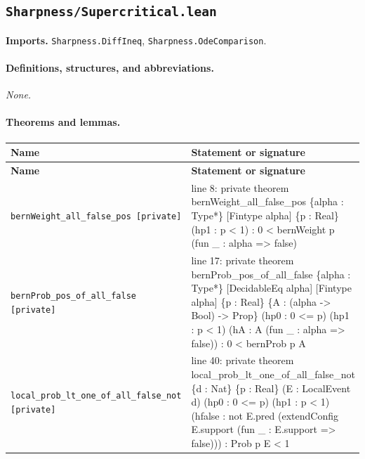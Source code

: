 \documentclass[10pt]{article}
\newcommand{\module}[1]{\texttt{#1}}
\begin{document}
\subsection*{\module{Sharpness/Supercritical.lean}}
\textbf{Imports.} \module{Sharpness.DiffIneq}, \module{Sharpness.OdeComparison}.
\paragraph{Definitions, structures, and abbreviations.}
\emph{None.}

\paragraph{Theorems and lemmas.}
\begin{longtable}{>{\raggedright\arraybackslash}p{} >{\raggedright\arraybackslash}p{}}
\textbf{Name} & \textbf{Statement or signature} \\
\hline
\endfirsthead
\textbf{Name} & \textbf{Statement or signature} \\
\hline
\endhead
\texttt{bernWeight\_\allowbreak{}all\_\allowbreak{}false\_\allowbreak{}pos [private]} & {\ttfamily\scriptsize line 8:\allowbreak{} private theorem bernWeight\_\allowbreak{}all\_\allowbreak{}false\_\allowbreak{}pos \{alpha :\allowbreak{} Type*\allowbreak{}\} [Fintype alpha] \{p :\allowbreak{} Real\} (\allowbreak{}hp1 :\allowbreak{} p < 1)\allowbreak{} :\allowbreak{} 0 < bernWeight p (\allowbreak{}fun \_\allowbreak{} :\allowbreak{} alpha =\allowbreak{}> false)\allowbreak{}} \\[0.45em]
\texttt{bernProb\_\allowbreak{}pos\_\allowbreak{}of\_\allowbreak{}all\_\allowbreak{}false [private]} & {\ttfamily\scriptsize line 17:\allowbreak{} private theorem bernProb\_\allowbreak{}pos\_\allowbreak{}of\_\allowbreak{}all\_\allowbreak{}false \{alpha :\allowbreak{} Type*\allowbreak{}\} [DecidableEq alpha] [Fintype alpha] \{p :\allowbreak{} Real\} \{A :\allowbreak{} (\allowbreak{}alpha -\allowbreak{}> Bool)\allowbreak{} -\allowbreak{}> Prop\} (\allowbreak{}hp0 :\allowbreak{} 0 <=\allowbreak{} p)\allowbreak{} (\allowbreak{}hp1 :\allowbreak{} p < 1)\allowbreak{} (\allowbreak{}hA :\allowbreak{} A (\allowbreak{}fun \_\allowbreak{} :\allowbreak{} alpha =\allowbreak{}> false)\allowbreak{})\allowbreak{} :\allowbreak{} 0 < bernProb p A} \\[0.45em]
\texttt{local\_\allowbreak{}prob\_\allowbreak{}lt\_\allowbreak{}one\_\allowbreak{}of\_\allowbreak{}all\_\allowbreak{}false\_\allowbreak{}not [private]} & {\ttfamily\scriptsize line 40:\allowbreak{} private theorem local\_\allowbreak{}prob\_\allowbreak{}lt\_\allowbreak{}one\_\allowbreak{}of\_\allowbreak{}all\_\allowbreak{}false\_\allowbreak{}not \{d :\allowbreak{} Nat\} \{p :\allowbreak{} Real\} (\allowbreak{}E :\allowbreak{} LocalEvent d)\allowbreak{} (\allowbreak{}hp0 :\allowbreak{} 0 <=\allowbreak{} p)\allowbreak{} (\allowbreak{}hp1 :\allowbreak{} p < 1)\allowbreak{} (\allowbreak{}hfalse :\allowbreak{} not E.\allowbreak{}pred (\allowbreak{}extendConfig E.\allowbreak{}support (\allowbreak{}fun \_\allowbreak{} :\allowbreak{} E.\allowbreak{}support =\allowbreak{}> false)\allowbreak{})\allowbreak{})\allowbreak{} :\allowbreak{} Prob p E < 1} \\[0.45em]

\end{longtable}
\end{document}
